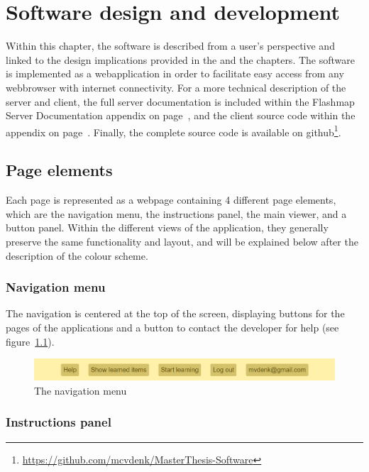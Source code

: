 \chapter{Software design and development}
\label{ch:software}

Within this chapter, the software is described from a user's perspective and linked to the design implications provided in the  and the  chapters. The software is implemented as a webapplication in order to facilitate easy access from any webbrowser with internet connectivity. For a more technical description of the server and client, the full server documentation is included within the Flashmap Server Documentation appendix on page~\pageref{app:documentation}, and the client source code within the  appendix on page~\pageref{app:clientsource}. Finally, the complete source code is available on github\footnote{\url{https://github.com/mcvdenk/MasterThesis-Software}}.

\section{Page elements}

Each page is represented as a webpage containing 4 different page elements, which are the navigation menu, the instructions panel, the main viewer, and a button panel. Within the different views of the application, they generally preserve the same functionality and layout, and will be explained below after the description of the colour scheme.

\subsection{Navigation menu}

The navigation is centered at the top of the screen, displaying buttons for the pages of the applications and a button to contact the developer for help (see figure~\ref{fig:navmenu}).

\begin{figure}
    \centering
    \includegraphics[width=.8\textwidth]{img/navmenu.png}
    \caption{The navigation menu}
    \label{fig:navmenu}
\end{figure}

\subsection{Instructions panel}

